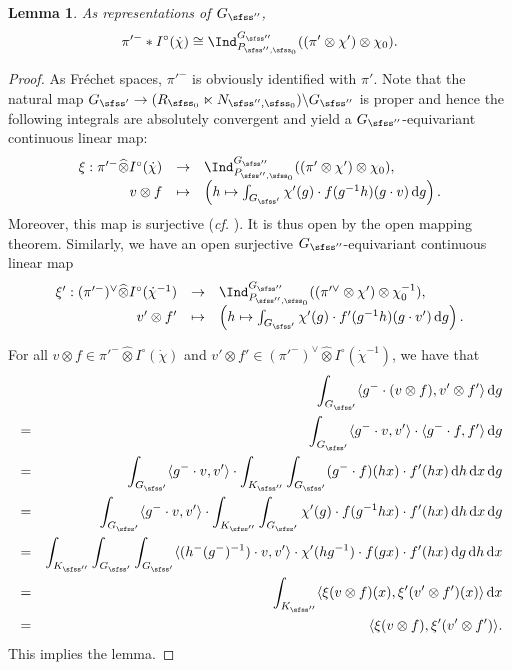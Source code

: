\documentclass[11pt,a4paper]{amsart}
\newcommand{\od}{\operatorname{d}}
\newcommand{\la}{\langle}
\newcommand{\ra}{\rangle}
\numberwithin{equation}{section}
\newtheorem{lem}[thm]{Lemma}
\theoremstyle{remark}
\def\cf{\emph{cf.} }
\begin{document}
\begin{lem}\label{isoipi}
 As representations of $G_{\sfss''}$,
 \[
   \pi'^-*I^\circ (\dot \chi)\cong \Ind_{P_{\sfss'',\sfss_0}}^{G_{\sfss''}} ((\pi'\otimes  \chi')\otimes \chi_0).
   \]
\end{lem}
\begin{proof}
As Fr\'echet spaces, $\pi'^-$ is obviously identified with $\pi'$.
Note that the natural map $G_{\sfss'}\rightarrow (R_{\sfss_0}\ltimes N_{\sfss'', \sfss_0})\backslash G_{\sfss''}$ is proper and hence the following integrals are absolutely convergent and yield a $G_{\sfss''}$-equivariant continuous linear map:
\[
\begin{array}{rcl}
\xi:   \pi'^-\widehat \otimes I^\circ (\dot \chi)&\rightarrow & \Ind_{P_{\sfss'',\sfss_0}}^{G_{\sfss''}} ((\pi'\otimes \chi')\otimes \chi_0),\\
   v\otimes f &\mapsto  & \left(h\mapsto\int_{G_{\sfss'}}\chi'(g)\cdot  f(g^{-1}h)(g\cdot v)\od\! g\right).
   \end{array}
\]
Moreover, this map is surjective (\cf \cite[Section 6.2]{CS21}). It is thus open by the open mapping theorem. Similarly, we have an open surjective
$G_{\sfss''}$-equivariant  continuous linear map
\[
\begin{array}{rcl}
\xi':   (\pi'^-)^\vee\widehat \otimes I^\circ (\dot \chi^{-1})&\rightarrow & \Ind_{P_{\sfss'',\sfss_0}}^{G_{\sfss''}} ((\pi'^\vee\otimes \chi')\otimes \chi_0^{-1}),\\
   v'\otimes f' &\mapsto  & \left(h\mapsto\int_{G_{\sfss'}} \chi'(g)\cdot  f'(g^{-1}h)(g\cdot v')\od\! g\right).
   \end{array}
\]

For all $v\otimes f \in \pi'^-\widehat \otimes I^\circ (\dot \chi)$ and $v'\otimes f' \in (\pi'^-)^\vee \widehat \otimes I^\circ (\dot \chi^{-1})$, we have that
\begin{eqnarray*}
 && \int_{G_{\sfss'}}\la g^-\cdot (v\otimes f), v'\otimes f'\ra \od\! g\\
 &=& \int_{G_{\sfss'}}\la g^-\cdot v, v'\ra \cdot \la g^-\cdot f, f'\ra \od\! g\\
 &=& \int_{G_{\sfss'}}\la g^-\cdot v, v'\ra \cdot \int_{K_{\sfss''}} \int_{G_{\sfss'}}   (g^-\cdot f)(hx) \cdot  f'(hx)  \od\! h \od \! x \od \! g\\
 &=& \int_{G_{\sfss'}}\la g^-\cdot v, v'\ra \cdot \int_{K_{\sfss''}} \int_{G_{\sfss'}}  \chi'(g) \cdot f(g^{-1}h x) \cdot  f'(hx)  \od\! h \od \! x \od \! g\\
  &=& \int_{K_{\sfss''}}  \int_{G_{\sfss'}}  \int_{G_{\sfss'}} \la (h^- (g^-)^{-1})\cdot v, v'\ra \cdot \chi'(hg^{-1}) \cdot f(gx) \cdot  f'(hx)  \od\! g \od \! h \od \! x \\
 &=&  \int_{K_{\sfss''}}\la  \xi(v\otimes f)(x),\xi'(v'\otimes f')(x)\ra  \od \! x\\
 &=& \la  \xi(v\otimes f),\xi'(v'\otimes f')\ra.
\end{eqnarray*}
This implies the lemma.
\end{proof}
\end{document}
